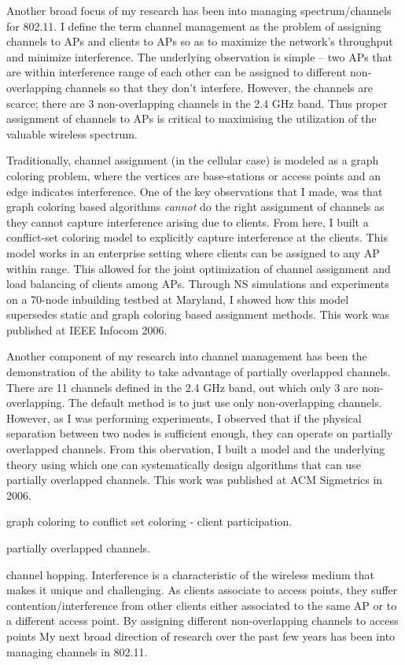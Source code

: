 \documentclass[11pt,letterpaper]{article}
\begin{document}
Another broad focus of my research  has been into managing spectrum/channels for 802.11. I define the term channel management
as the problem of assigning channels to APs and clients to APs so as to maximize the network's throughput and minimize
interference. The underlying observation is simple -- two APs that are within interference range of each other can be
assigned to different non-overlapping channels so that they don't interfere. However, the channels are scarce; there are
3 non-overlapping channels in the 2.4 GHz band. Thus proper assignment of channels to APs is critical to maximising the
utilization of the valuable wireless spectrum. 

Traditionally, channel assignment (in the cellular case) is modeled as a graph coloring problem, where the vertices are
base-stations or access points and an edge indicates interference. One of the key observations that I made, was that
graph coloring based algorithms {\it cannot} do the right assignment of channels as they cannot capture interference
arising due to clients. From here, I built a conflict-set coloring model to explicitly capture interference at the
clients. This model works in an enterprise setting where clients can be assigned to any AP within range. This allowed
for the joint optimization of channel assignment and load balancing of clients among APs. Through NS simulations and
experiments on a 70-node inbuilding testbed at Maryland, I showed how this model supersedes static and graph coloring
based assignment methods. This work was published at IEEE Infocom 2006. 

Another component of my research into channel management has been the demonstration of the ability to take
advantage of partially overlapped channels. There are 11 channels defined in the 2.4 GHz band, out which only
3 are non-overlapping. The default method is to just use only non-overlapping channels. However, as I was performing
experiments, I observed that if the physical separation between two nodes is sufficient enough, they can operate on
partially overlapped channels. From this obervation, I built a model and the underlying theory using which one
can systematically design algorithms that can use partially overlapped channels. This work was published at 
ACM Sigmetrics in 2006.  
 
graph coloring to conflict set coloring - client participation.

partially overlapped channels.

channel hopping.
Interference is a characteristic of the wireless medium that makes it unique and challenging. As clients associate
to access points, they suffer contention/interference from other clients either associated to the same AP  
or to a different access point. By assigning different non-overlapping channels to access points
 My next broad direction
of research over the past few years has been into managing channels in 802.11. 
\end{document}
